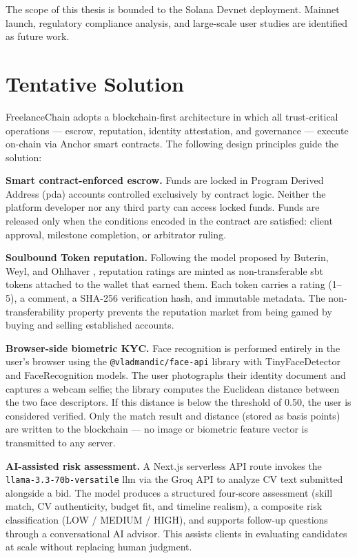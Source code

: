 The scope of this thesis is bounded to the Solana Devnet deployment. Mainnet launch, regulatory compliance analysis, and large-scale user studies are identified as future work.

\section{Tentative Solution}
\label{section:1.3}

FreelanceChain adopts a blockchain-first architecture in which all trust-critical operations --- escrow, reputation, identity attestation, and governance --- execute on-chain via Anchor smart contracts. The following design principles guide the solution:

\textbf{Smart contract-enforced escrow.} Funds are locked in Program Derived Address (\gls{pda}) accounts controlled exclusively by contract logic. Neither the platform developer nor any third party can access locked funds. Funds are released only when the conditions encoded in the contract are satisfied: client approval, milestone completion, or arbitrator ruling.

\textbf{Soulbound Token reputation.} Following the model proposed by Buterin, Weyl, and Ohlhaver \cite{weyl2022decentralized}, reputation ratings are minted as non-transferable \gls{sbt} tokens attached to the wallet that earned them. Each token carries a rating (1--5), a comment, a SHA-256 verification hash, and immutable metadata. The non-transferability property prevents the reputation market from being gamed by buying and selling established accounts.

\textbf{Browser-side biometric KYC.} Face recognition is performed entirely in the user's browser using the \texttt{@vladmandic/face-api} library with TinyFaceDetector and FaceRecognition models. The user photographs their identity document and captures a webcam selfie; the library computes the Euclidean distance between the two face descriptors. If this distance is below the threshold of 0.50, the user is considered verified. Only the match result and distance (stored as basis points) are written to the blockchain --- no image or biometric feature vector is transmitted to any server.

\textbf{AI-assisted risk assessment.} A Next.js serverless API route invokes the \texttt{llama-3.3-70b-versatile} \gls{llm} via the Groq API to analyze CV text submitted alongside a bid. The model produces a structured four-score assessment (skill match, CV authenticity, budget fit, and timeline realism), a composite risk classification (LOW / MEDIUM / HIGH), and supports follow-up questions through a conversational AI advisor. This assists clients in evaluating candidates at scale without replacing human judgment.

